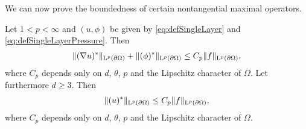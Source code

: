 We can now prove the boundedness of certain nontangential maximal operators.
\begin{lem}
  \label{lem:nontangentialMaximalFunctions}
  Let $1 < p < \infty$ and $(u,\phi)$ be given by \eqref{eq:defSingleLayer} and \eqref{eq:defSingleLayerPressure}.
  Then 
  \begin{align}
    \| (\nabla u)^* \|_{\mathrm{L}^p(\partial\Omega)}  +  \| (\phi)^* \|_{\mathrm{L}^p(\partial\Omega)} \leq C_p \|f\|_{\mathrm{L}^p(\partial\Omega)},
  \end{align}
  where $C_p$ depends only on $d$, $\theta$, $p$ and the Lipschitz character of $\Omega$.
  Let furthermore $d \geq 3$. Then
  \begin{align*}
     \|(u)^*\|_{\mathrm{L}^p(\partial\Omega)} \leq C_p \|f\|_{\mathrm{L}^p(\partial\Omega)},
  \end{align*}
  where $C_p$ depends only on $d$, $\theta$, $p$ and the Lipschitz character of $\Omega$.
\end{lem}

